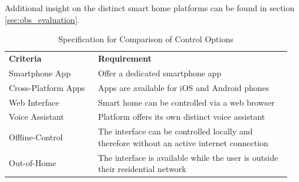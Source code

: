 \noindent
Additional insight on the distinct smart home platforms can be found in section \ref{sec:obs_evaluation}.

\begin{table}[H]
    \centering
    \caption{Specification for Comparison of Control Options}
    \label{tab:spec_control}
    \begin{tabular}{ >{\raggedright} p{0.3\linewidth} p{0.65\linewidth} }
        \toprule
        \multicolumn{2}{ l }{\textbf{Control Options}} \\
        \midrule
        \textbf{Criteria} & \textbf{Requirement} \\
        \midrule
        Smartphone App & Offer a dedicated smartphone app \\ \addlinespace
        Cross-Platform Apps & Apps are available for iOS and Android phones \\ \addlinespace
        Web Interface & Smart home can be controlled via a web browser \\ \addlinespace
        Voice Assistant & Platform offers its own distinct voice assistant \\ \addlinespace
        Offline-Control & The interface can be controlled locally and therefore without an active internet connection \\ \addlinespace
        Out-of-Home & The interface is available while the user is outside their residential network \\ 
        \bottomrule
    \end{tabular}
\end{table}

